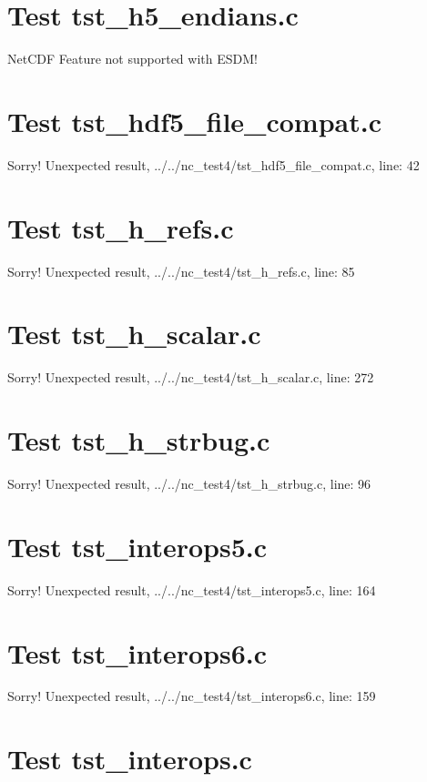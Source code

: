 \section{Test tst\_h5\_endians.c}

NetCDF Feature not supported with ESDM!

\section{Test tst\_hdf5\_file\_compat.c}

Sorry! Unexpected result, ../../nc\_test4/tst\_hdf5\_file\_compat.c, line: 42

\section{Test tst\_h\_refs.c}

Sorry! Unexpected result, ../../nc\_test4/tst\_h\_refs.c, line: 85

\section{Test tst\_h\_scalar.c}

Sorry! Unexpected result, ../../nc\_test4/tst\_h\_scalar.c, line: 272

\section{Test tst\_h\_strbug.c}

Sorry! Unexpected result, ../../nc\_test4/tst\_h\_strbug.c, line: 96

\section{Test tst\_interops5.c}

Sorry! Unexpected result, ../../nc\_test4/tst\_interops5.c, line: 164

\section{Test tst\_interops6.c}

Sorry! Unexpected result, ../../nc\_test4/tst\_interops6.c, line: 159

\section{Test tst\_interops.c}


